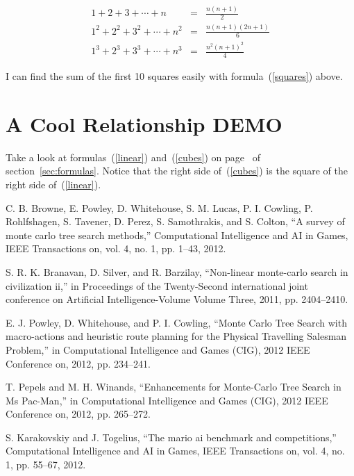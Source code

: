 \documentclass[10pt,a4paper,twoside]{article}
\begin{document}
\begin{eqnarray}
1+2+3+\cdots+n&=&\frac{n(n+1)}{2}\label{linear}\\
1^2+2^2+3^2+\cdots+n^2&=& \frac{n(n+1)(2n+1)}{6}\label{squares}\\
1^3+2^3+3^3+\cdots+n^3&=& \frac{n^2(n+1)^2}{4}\label{cubes}
\end{eqnarray}

I can find the sum of the first 10 squares easily with formula~(\ref{squares}) above.

\pagebreak

\section{A Cool Relationship DEMO}

Take a look at formulas~(\ref{linear}) and~(\ref{cubes}) on
page~\pageref{linear} of section~\ref{sec:formulas}. Notice that the
right side of~(\ref{cubes}) is the square of the right side
of~(\ref{linear}).


\begin{thebibliography}{99}

  C. B. Browne, E. Powley, D. Whitehouse, S. M. Lucas, P. I. Cowling, P. Rohlfshagen, S. Tavener, D. Perez, S. Samothrakis, and S. Colton, “A survey of monte carlo tree search methods,” Computational Intelligence and AI in Games, IEEE Transactions on, vol. 4, no. 1, pp. 1–43, 2012.

S. R. K. Branavan, D. Silver, and R. Barzilay, “Non-linear monte-carlo search in civilization ii,” in Proceedings of the Twenty-Second international joint conference on Artificial Intelligence-Volume Volume Three, 2011, pp. 2404–2410.

E. J. Powley, D. Whitehouse, and P. I. Cowling, “Monte Carlo Tree Search with macro-actions and heuristic route planning for the Physical Travelling Salesman Problem,” in Computational Intelligence and Games (CIG), 2012 IEEE Conference on, 2012, pp. 234–241.

T. Pepels and M. H. Winands, “Enhancements for Monte-Carlo Tree Search in Ms Pac-Man,” in Computational Intelligence and Games (CIG), 2012 IEEE Conference on, 2012, pp. 265–272.

S. Karakovskiy and J. Togelius, “The mario ai benchmark and competitions,” Computational Intelligence and AI in Games, IEEE Transactions on, vol. 4, no. 1, pp. 55–67, 2012.

\end{thebibliography}
\end{document}
